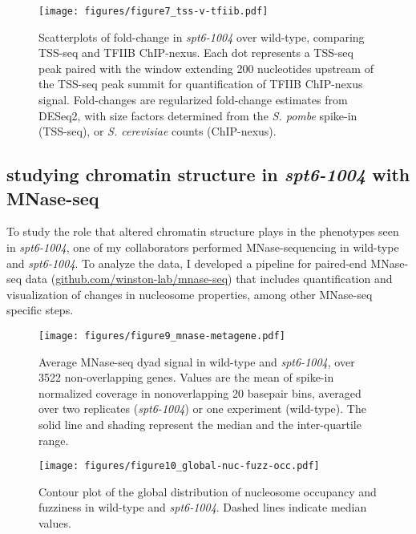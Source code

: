 \documentclass[10pt, letterpaper]{article}
\begin{document}
\begin{figure}[h]
\centering
\texttt{[image: figures/figure7\_tss-v-tfiib.pdf]}
\caption{Scatterplots of fold-change in \textit{spt6-1004} over wild-type, comparing TSS-seq and TFIIB ChIP-nexus. Each dot represents a TSS-seq peak paired with the window extending 200 nucleotides upstream of the TSS-seq peak summit for quantification of TFIIB ChIP-nexus signal. Fold-changes are regularized fold-change estimates from DESeq2, with size factors determined from the \textit{S. pombe} spike-in (TSS-seq), or \textit{S. cerevisiae} counts (ChIP-nexus).}
\end{figure}

\subsection{studying chromatin structure in \textit{spt6-1004} with MNase-seq}

To study the role that altered chromatin structure plays in the phenotypes seen in \textit{spt6-1004}, one of my collaborators performed MNase-sequencing in wild-type and \textit{spt6-1004}. To analyze the data, I developed a pipeline for paired-end MNase-seq data (\href{https://github.com/winston-lab/mnase-seq}{github.com/winston-lab/mnase-seq}) that includes quantification and visualization of changes in nucleosome properties, among other MNase-seq specific steps.

\begin{figure}[h]
    \centering
    \begin{minipage}[t]{8.5cm}
        \centering
        \texttt{[image: figures/figure9\_mnase-metagene.pdf]}
        \caption{Average MNase-seq dyad signal in wild-type and \textit{spt6-1004}, over 3522 non-overlapping genes. Values are the mean of spike-in normalized coverage in nonoverlapping 20 basepair bins, averaged over two replicates (\textit{spt6-1004}) or one experiment (wild-type). The solid line and shading represent the median and the inter-quartile range.}
        \label{fig:mnase_metagene}
    \end{minipage}\hfill
    \begin{minipage}[t]{8.5cm}
        \centering
        \texttt{[image: figures/figure10\_global-nuc-fuzz-occ.pdf]}
        \caption{Contour plot of the global distribution of nucleosome occupancy and fuzziness in wild-type and \textit{spt6-1004}. Dashed lines indicate median values.}
        \label{fig:global_nuc_fuzz}
    \end{minipage}
\end{figure}
\end{document}
